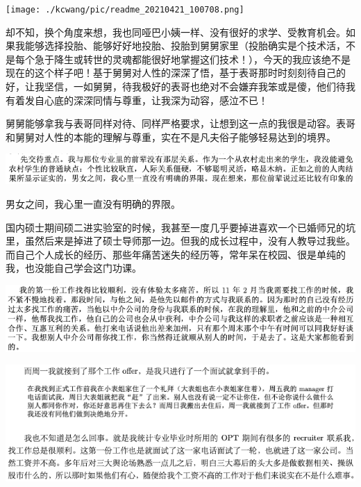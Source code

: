 \documentclass[9pt, b5paper]{article}
\begin{document}
\begin{center}
\texttt{[image: ./kcwang/pic/readme\_20210421\_100708.png]}
\end{center}

却不知，换个角度来想，我也同哑巴小姨一样、没有很好的求学、受教育机会。如果我能够选择投胎、能够好好地投胎、投胎到舅舅家里（投胎确实是个技术活，不是每个急于降生或转世的灵魂都能很好地掌握这们技术！），今天的我应该绝不是现在的这个样子吧！基于舅舅对人性的深深了悟，基于表哥那时时刻刻待自己的好，让我坚信，一如舅舅，待我极好的表哥也绝对不会嫌弃我笨或是傻，他们待我有着发自心底的深深同情与尊重，让我深为动容，感泣不已！

舅舅能够拿我与表哥同样对待、同样严格要求，让想到这一点的我很是动容。表哥和舅舅对人性的本能的理解与尊重，实在不是凡夫俗子能够轻易达到的境界。

\begin{center}
\includegraphics[width=.9\linewidth]{./pic/backups_plans_20210412_104246.png}
\end{center}

男女之间，我心里一直没有明确的界限。

国内硕士期间硕二进实验室的时候，我甚至一度几乎要掉进喜欢一个已婚师兄的坑里，虽然后来是掉进了硕士导师那一边。但我的成长过程中，没有人教导过我些。而自己个人成长的经历、那些年痛苦迷失的经历等，常年呆在校园、很是单纯的我，也没能自己学会这门功课。

\begin{center}
\includegraphics[width=.9\linewidth]{./pic/backups_plans_20210412_104359.png}
\end{center}

\begin{center}
\includegraphics[width=.9\linewidth]{./pic/backups_plans_20210412_113237.png}
\end{center}
\end{document}
